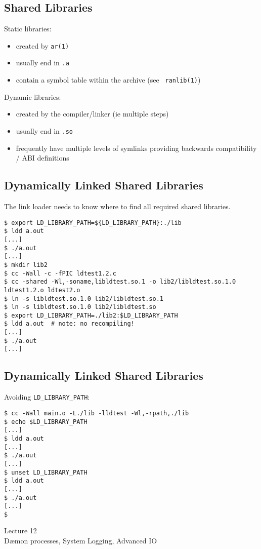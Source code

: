 \documentclass[xga]{xdvislides}
\begin{document}
\subsection{Shared Libraries}
Static libraries:
\begin{itemize}
	\item created by {\tt ar(1)}
	\item usually end in {\tt .a}
	\item contain a symbol table within the archive (see {\tt
		ranlib(1)})
\end{itemize}

Dynamic libraries:
\begin{itemize}
	\item created by the compiler/linker (ie multiple steps)
	\item usually end in {\tt .so}
	\item frequently have multiple levels of symlinks providing
		backwards compatibility / ABI definitions
\end{itemize}

\subsection{Dynamically Linked Shared Libraries}
The link loader needs to know where to find all required shared libraries.
\begin{verbatim}
$ export LD_LIBRARY_PATH=${LD_LIBRARY_PATH}:./lib
$ ldd a.out
[...]
$ ./a.out
[...]
$ mkdir lib2
$ cc -Wall -c -fPIC ldtest1.2.c
$ cc -shared -Wl,-soname,libldtest.so.1 -o lib2/libldtest.so.1.0 ldtest1.2.o ldtest2.o
$ ln -s libldtest.so.1.0 lib2/libldtest.so.1
$ ln -s libldtest.so.1.0 lib2/libldtest.so
$ export LD_LIBRARY_PATH=./lib2:$LD_LIBRARY_PATH
$ ldd a.out  # note: no recompiling!
[...]
$ ./a.out
[...]
\end{verbatim}

\subsection{Dynamically Linked Shared Libraries}
Avoiding {\tt LD\_LIBRARY\_PATH}:
\begin{verbatim}
$ cc -Wall main.o -L./lib -lldtest -Wl,-rpath,./lib
$ echo $LD_LIBRARY_PATH
[...]
$ ldd a.out
[...]
$ ./a.out
[...]
$ unset LD_LIBRARY_PATH
$ ldd a.out
[...]
$ ./a.out
[...]
$
\end{verbatim}

\newpage
\vspace*{\fill}
\begin{center}
  \Hugesize
	Lecture 12
	\hspace*{5mm}\blueline\\ [1em]
	D\ae mon processes, System Logging, Advanced IO
  \Normalsize
\end{center}
\vspace*{\fill}
\end{document}
